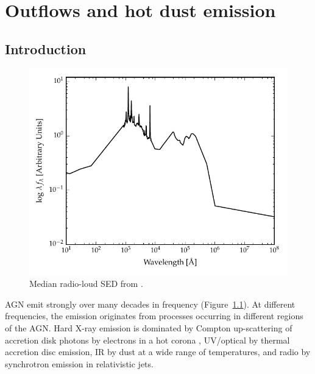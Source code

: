 
\chapter{Outflows and hot dust emission}
\label{ch:sed} 



\section{Introduction}

\begin{figure}
  \centering
  \includegraphics[width=\textwidth]{figures/chapter05/shangsed.pdf}
  \caption{Median radio-loud SED from \citet{shang11}.}
  \label{fig:seyfert_sed}
\end{figure}

AGN emit strongly over many decades in frequency (Figure~\ref{fig:seyfert_sed}). 
At different frequencies, the emission originates from processes occurring in different regions of the AGN. 
Hard X-ray emission is dominated by Compton up-scattering of accretion disk photons by electrons in a hot corona \citep[e.g.][]{sunyaev80}, UV/optical by thermal accretion disc emission, IR by dust at a wide range of temperatures, and radio by synchrotron emission in relativistic jets.   

